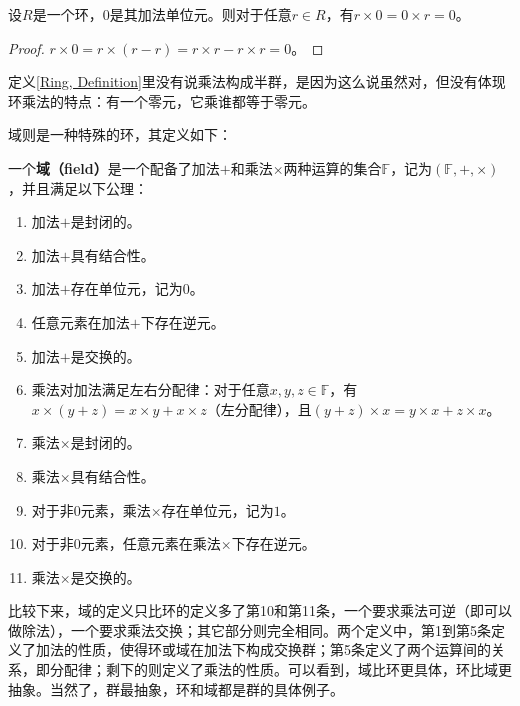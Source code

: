 \begin{theo}\label{zeromultiple}
设$R$是一个环，$0$是其加法单位元。则对于任意$r\in R$，有$r\times 0=0\times r=0$。
\end{theo}
\begin{proof}

$r\times 0=r\times (r-r)=r\times r-r\times r=0$。

\end{proof}

定义\ref{Ring, Definition}里没有说乘法构成半群，是因为这么说虽然对，但没有体现环乘法的特点：有一个零元，它乘谁都等于零元。




域则是一种特殊的环，其定义如下：




\begin{defi}\label{Field, Definition}
一个\textbf{域（field）}是一个配备了加法$+$和乘法$\times$两种运算的集合$\mathbb{F}$，记为$(\mathbb{F}, +, \times)$，并且满足以下公理：

\begin{enumerate}
    \item 加法$+$是封闭的。
    \item 加法$+$具有结合性。
    \item 加法$+$存在单位元，记为$0$。
    \item 任意元素在加法$+$下存在逆元。
    \item 加法$+$是交换的。
    \item 乘法对加法满足左右分配律：对于任意$x, y, z\in \mathbb{F}$，有$x\times(y+z)=x\times y+x\times z$（左分配律），且$(y+z)\times x=y\times x+z\times x$。
    \item 乘法$\times$是封闭的。
    \item 乘法$\times$具有结合性。
    \item 对于非$0$元素，乘法$\times$存在单位元，记为$1$。
    \item 对于非$0$元素，任意元素在乘法$\times$下存在逆元。
    \item 乘法$\times$是交换的。
\end{enumerate}
\end{defi}

比较下来，域的定义只比环的定义多了第10和第11条，一个要求乘法可逆（即可以做除法），一个要求乘法交换；其它部分则完全相同。两个定义中，第1到第5条定义了加法的性质，使得环或域在加法下构成交换群；第5条定义了两个运算间的关系，即分配律；剩下的则定义了乘法的性质。可以看到，域比环更具体，环比域更抽象。当然了，群最抽象，环和域都是群的具体例子。

